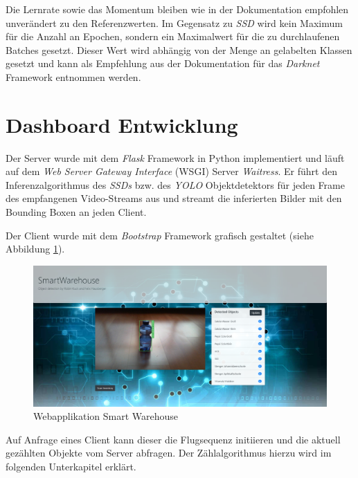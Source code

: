 Die Lernrate sowie das Momentum bleiben wie in der Dokumentation empfohlen unverändert zu den Referenzwerten. Im Gegensatz zu \textit{SSD} wird kein Maximum für die Anzahl an Epochen, sondern ein Maximalwert für die zu durchlaufenen Batches gesetzt. Dieser Wert wird abhängig von der Menge an gelabelten Klassen gesetzt und kann als Empfehlung aus der Dokumentation für das \textit{Darknet} Framework entnommen werden. 

\section{Dashboard Entwicklung}

Der Server wurde mit dem \textit{Flask} Framework in Python implementiert und läuft auf dem \textit{Web Server Gateway Interface} (WSGI) Server \textit{Waitress}. Er führt den Inferenzalgorithmus des \textit{SSDs} bzw. des \textit{YOLO} Objektdetektors für jeden Frame des empfangenen Video-Streams aus und streamt die inferierten Bilder mit den Bounding Boxen an jeden Client. 



Der Client wurde mit dem \textit{Bootstrap} Framework grafisch gestaltet (siehe Abbildung \ref{webapp}).

\begin{figure}[H]
	\begin{center}
		\includegraphics[width=15cm]{Bilder/webapp.jpeg} 
		\caption[Webapplikation Smart Warehouse]{Webapplikation Smart Warehouse}
		\label{webapp}
	\end{center}
\end{figure}

Auf Anfrage eines Client kann dieser die Flugsequenz initiieren und die aktuell gezählten Objekte vom Server abfragen. Der Zählalgorithmus hierzu wird im folgenden Unterkapitel erklärt. 

